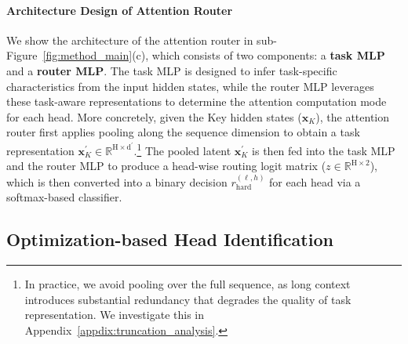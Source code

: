 \paragraph{Architecture Design of Attention Router}
We show the architecture of the attention router in sub-Figure~\ref{fig:method_main}(c), which consists of two components: a \textbf{task MLP} and a \textbf{router MLP}.
The task MLP is designed to infer task-specific characteristics from the input hidden states, while the router MLP leverages these task-aware representations to determine the attention computation mode for each head.
More concretely, given the Key hidden states ($\boldsymbol{x}_K$), the attention router first applies pooling along the sequence dimension to obtain a task representation $\boldsymbol{x}_K^{\prime}\in\mathrm{\mathbb{R}^{H\times d^{\prime}}}$.\footnote{In practice, we avoid pooling over the full sequence, as long context introduces substantial redundancy that degrades the quality of task representation. We investigate this in Appendix~\ref{appdix:truncation_analysis}.}
The pooled latent $\boldsymbol{x}_K^{\prime}$ is then fed into the task MLP and the router MLP to produce a head-wise routing logit matrix ($z\in\mathrm{\mathbb{R}^{H\times 2}}$), which is then converted into a binary decision $r_\mathrm{{hard}}^{(\ell,h)}$ for each head via a softmax-based classifier.

\subsection{Optimization-based Head Identification}
\label{subsec:head_identification_optimization}

